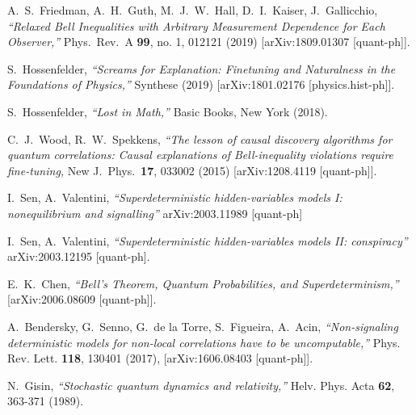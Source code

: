 \documentclass[11pt,twoside,A4]{article}
\begin{document}
\begin{thebibliography}{99}
{  %
  A.~S.~Friedman, A.~H.~Guth, M.~J.~W.~Hall, D.~I.~Kaiser, J.~Gallicchio,
  {\sl ``Relaxed Bell Inequalities with Arbitrary Measurement Dependence for Each Observer,''}
  Phys.\ Rev.\ A {\bf 99}, no. 1, 012121 (2019)
  [arXiv:1809.01307 [quant-ph]].

  S.~Hossenfelder,
  {\sl ``Screams for Explanation: Finetuning and Naturalness in the Foundations of Physics,''} Synthese (2019)
[arXiv:1801.02176 [physics.hist-ph]].

  S.~Hossenfelder,
  {\sl ``Lost in Math,''} Basic Books, New York (2018).

 


C.~J.~Wood, R.~W.~Spekkens, {\sl ``The lesson of causal discovery algorithms for quantum correlations: Causal explanations of Bell-inequality violations require fine-tuning,} New J.\ Phys.\ {\bf 17}, 033002 (2015) [arXiv:1208.4119 [quant-ph]].
 

 I.~Sen, A.~Valentini, {\sl ``Superdeterministic hidden-variables models I: nonequilibrium and signalling''} 	arXiv:2003.11989 [quant-ph]

 I.~Sen, A.~Valentini, {\sl ``Superdeterministic hidden-variables models II: conspiracy''} arXiv:2003.12195 [quant-ph].

E.~K.~Chen,
{\sl ``Bell's Theorem, Quantum Probabilities, and Superdeterminism,''}
[arXiv:2006.08609 [quant-ph]].
 
 
A.~Bendersky, G.~Senno, G.~de la Torre, S.~Figueira, A.~Acin, {\sl ``Non-signaling deterministic models for non-local correlations have to be uncomputable,''} Phys. Rev. Lett. {\bf 118}, 130401 (2017), [arXiv:1606.08403 [quant-ph]].

    
 

N.~Gisin,
{\sl ``Stochastic quantum dynamics and relativity,''}
Helv. Phys. Acta \textbf{62}, 363-371 (1989).

}
\end{thebibliography}
\end{document}
